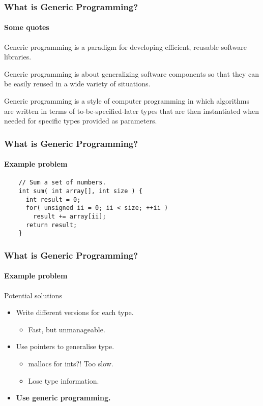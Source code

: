 \begin{frame}
  \frametitle{What is Generic Programming?}
  \framesubtitle{Some quotes}
  \begin{block}{}
  {\Large Generic programming is a paradigm for developing efficient, reusable
    software libraries.}
  \end{block}
  \pause
  \begin{block}{}
    {\Large Generic programming is about generalizing software components
      so that they can be easily reused in a wide variety of situations.}
  \end{block}
  \pause
  \begin{block}{}
    {\Large Generic programming is a style of computer programming
      in which algorithms are written in terms of to-be-specified-later
      types that are then instantiated when needed for specific types
      provided as parameters.}
  \end{block}
\end{frame}

\begin{frame}[fragile]
  \frametitle{What is Generic Programming?}
  \framesubtitle{Example problem}
  \begin{example}
    \begin{lstlisting}
    // Sum a set of numbers.
    int sum( int array[], int size ) {
      int result = 0;
      for( unsigned ii = 0; ii < size; ++ii )
        result += array[ii];
      return result;
    }
    \end{lstlisting}
  \end{example}
\end{frame}

\begin{frame}
  \frametitle{What is Generic Programming?}
  \framesubtitle{Example problem}
  \begin{block}{Potential solutions}
  \begin{itemize}
  \item Write different versions for each type.
    \begin{itemize}
    \item Fast, but unmanageable.
    \end{itemize}
  \item Use pointers to generalise type.
    \begin{itemize}
    \item mallocs for ints?! Too slow.
    \item Lose type information.
    \end{itemize}
  \item {\bf Use generic programming.}
  \end{itemize}
  \end{block}
\end{frame}

